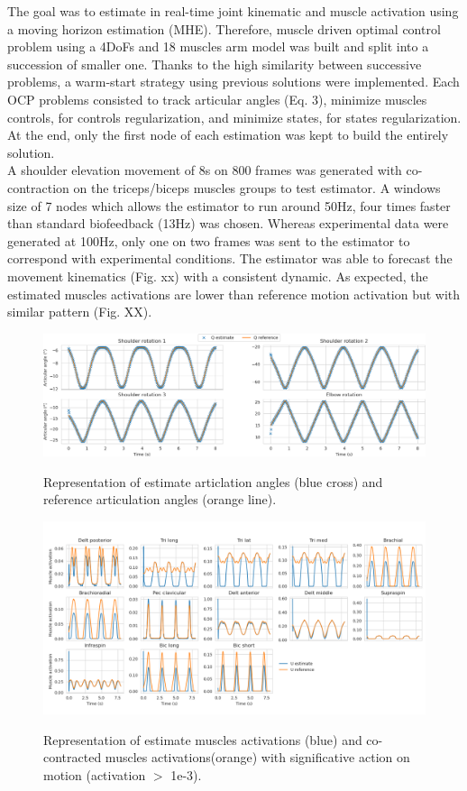 The goal was to estimate in real-time joint kinematic and muscle activation using a moving horizon estimation (MHE). Therefore, muscle driven optimal control problem using a 4DoFs and 18 muscles arm model was built and split into a succession of smaller one. Thanks to the high similarity between successive problems, a warm-start strategy using previous solutions were implemented. Each OCP problems consisted to track articular angles (Eq. 3), minimize muscles controls, for controls regularization, and minimize states, for states regularization. At the end, only the first node of each estimation was kept to build the entirely solution.\\ A shoulder elevation movement of 8s on 800 frames was generated with co-contraction on the triceps/biceps muscles groups to test estimator. A windows size of 7 nodes which allows the estimator to run around 50Hz, four times faster than standard biofeedback (13Hz) was chosen. Whereas experimental data were generated at 100Hz, only one on two frames was sent to the estimator to correspond with experimental conditions. The estimator was able to forecast the movement kinematics (Fig. xx) with a consistent dynamic. As expected, the estimated muscles activations are lower than reference motion activation but with similar pattern (Fig. XX). 

\begin{figure}[t!]
\centering
\includegraphics[width=\textwidth]{figures/Articular_angle_MHE.png}\\
\caption{Representation of estimate articlation angles (blue cross) and reference articulation angles (orange line).}
\label{fig:angulare_angle_MHE}
\end{figure}
\begin{figure}[t!]
\centering
\includegraphics[width=\textwidth]{figures/Muscles_excitations_MHE.png}\\
\caption{Representation of estimate muscles activations (blue) and co-contracted muscles activations(orange) with significative action on motion (activation $>$ 1e-3).}
\label{fig:muscles_excitations_MHE}
\end{figure}
